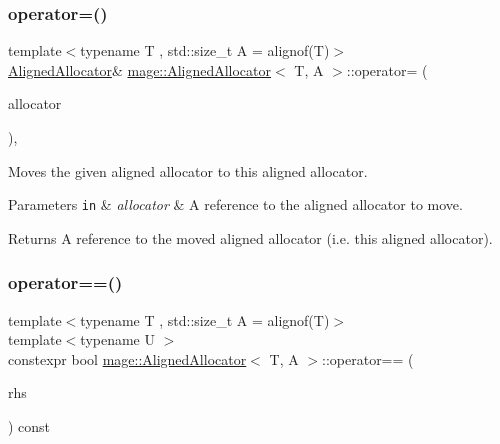 \subsubsection{\texorpdfstring{operator=()}{operator=()}\hspace{0.1cm}{\footnotesize\ttfamily [2/2]}}
{\footnotesize\ttfamily template$<$typename T , std\+::size\+\_\+t A = alignof(\+T)$>$ \\
\mbox{\hyperlink{classmage_1_1_aligned_allocator}{Aligned\+Allocator}}\& \mbox{\hyperlink{classmage_1_1_aligned_allocator}{mage\+::\+Aligned\+Allocator}}$<$ T, A $>$\+::operator= (\begin{DoxyParamCaption}\item[{\mbox{\hyperlink{classmage_1_1_aligned_allocator}{Aligned\+Allocator}}$<$ T, A $>$ \&\&}]{allocator }\end{DoxyParamCaption})\hspace{0.3cm}{\ttfamily [default]}, {\ttfamily [noexcept]}}

Moves the given aligned allocator to this aligned allocator.


\begin{DoxyParams}[1]{Parameters}
\mbox{\tt in}  & {\em allocator} & A reference to the aligned allocator to move. \\
\hline
\end{DoxyParams}
\begin{DoxyReturn}{Returns}
A reference to the moved aligned allocator (i.\+e. this aligned allocator). 
\end{DoxyReturn}
\mbox{\label{classmage_1_1_aligned_allocator_aefad04504ff2eb8f73c9ebd15d7fbdad}} 
\subsubsection{\texorpdfstring{operator==()}{operator==()}}
{\footnotesize\ttfamily template$<$typename T , std\+::size\+\_\+t A = alignof(\+T)$>$ \\
template$<$typename U $>$ \\
constexpr bool \mbox{\hyperlink{classmage_1_1_aligned_allocator}{mage\+::\+Aligned\+Allocator}}$<$ T, A $>$\+::operator== (\begin{DoxyParamCaption}\item[{\mbox{[}\mbox{[}maybe\+\_\+unused\mbox{]} \mbox{]} const \mbox{\hyperlink{classmage_1_1_aligned_allocator}{Aligned\+Allocator}}$<$ U, A $>$ \&}]{rhs }\end{DoxyParamCaption}) const\hspace{0.3cm}{\ttfamily [noexcept]}}

